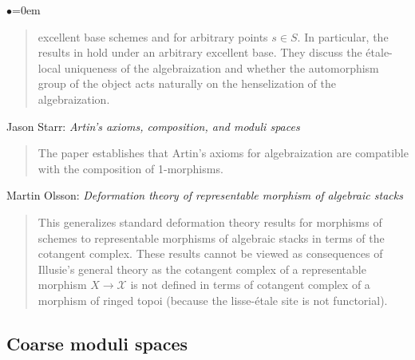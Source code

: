 \begin{list}{$\bullet$}{\leftmargin=0em}
\begin{quote}
excellent base schemes and for arbitrary points $s \in S$.
In particular, the results in \cite{ArtinVersal} hold under an arbitrary
excellent base. They discuss the \'etale-local uniqueness of the
algebraization and whether the automorphism group of the object acts naturally
on the henselization of the algebraization.
\end{quote}
\smallskip
\item Jason Starr: \emph{Artin's axioms, composition, and moduli spaces}
\cite{starr_artin}
\begin{quote}
The paper establishes that Artin's axioms for algebraization are compatible
with the composition of 1-morphisms.
\end{quote}
\smallskip
\item Martin Olsson: \emph{Deformation theory of representable
morphism of algebraic stacks} \cite{olsson_deformation}
\begin{quote}
This generalizes standard deformation theory results for morphisms of schemes
to representable morphisms of algebraic stacks in terms of the cotangent
complex. These results cannot be viewed as consequences of Illusie's general
theory as the cotangent complex of a representable morphism $X \to \mathcal{X}$
is not
defined in terms of cotangent complex of a morphism of ringed topoi (because
the lisse-\'etale site is not functorial).
\end{quote}
\end{list}

\subsection{Coarse moduli spaces}
\label{subsection-coarse-moduli-spaces}


